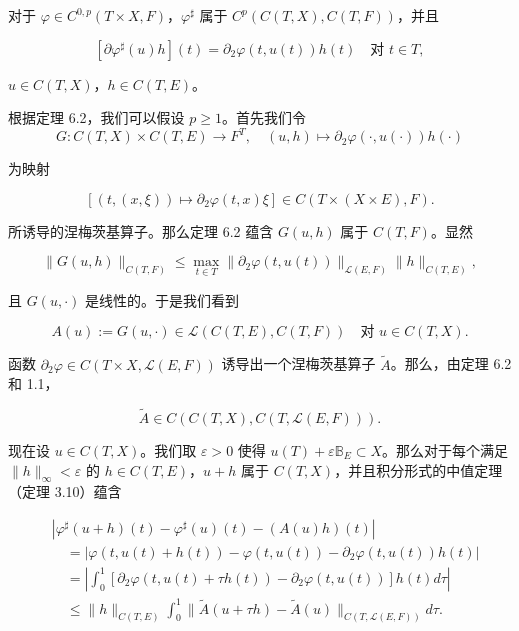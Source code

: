\begin{theorem}

对于 $ \varphi \in C^{0,p}(T \times X, F) $，$ \varphi^{\sharp} $ 属于 $ C^{p}(C(T, X), C(T, F)) $，并且

\[
[\partial\varphi^{\sharp}(u)h](t) = \partial_{2}\varphi(t, u(t))h(t) \quad \text{对 } t \in T ,
\]

$ u \in C(T, X) $，$ h \in C(T, E) $。

\proofhead
根据定理 6.2，我们可以假设 $ p \ge 1 $。首先我们令
\[
G : C(T, X) \times C(T, E) \to F^{T} , \quad (u, h) \mapsto \partial_{2}\varphi(\cdot, u(\cdot))h(\cdot)
\]

为映射

\[
[(t, (x, \xi)) \mapsto \partial_{2}\varphi(t, x)\xi] \in C(T \times (X \times E), F) .
\]

所诱导的涅梅茨基算子。那么定理 6.2 蕴含 $ G(u, h) $ 属于 $ C(T, F) $。显然

\begin{equation}
\|G(u, h)\|_{C(T,F)} \le \max_{t \in T}\|\partial_{2}\varphi(t, u(t))\|_{\mathcal{L}(E,F)}\|h\|_{C(T,E)} ,\tag{6.1}
\end{equation}

且 $ G(u, \cdot) $ 是线性的。于是我们看到

\[
A(u) := G(u, \cdot) \in \mathcal{L}(C(T, E), C(T, F)) \quad \text{对 } u \in C(T, X) .
\]

函数 $ \partial_{2}\varphi \in C(T \times X, \mathcal{L}(E, F)) $ 诱导出一个涅梅茨基算子 $ \widetilde{A} $。那么，由定理 6.2 和 1.1，

\begin{equation}
\widetilde{A} \in C(C(T, X), C(T, \mathcal{L}(E, F))) .\tag{6.2}
\end{equation}

现在设 $ u \in C(T, X) $。我们取 $ \varepsilon > 0 $ 使得 $ u(T) + \varepsilon\mathbb{B}_{E} \subset X $。那么对于每个满足 $ \|h\|_{\infty} < \varepsilon $ 的 $ h \in C(T, E) $，$ u + h $ 属于 $ C(T, X) $，并且积分形式的中值定理（定理 3.10）蕴含

\begin{equation*}
\begin{aligned}
&\left|\varphi^{\sharp}(u + h)(t) - \varphi^{\sharp}(u)(t) - (A(u)h)(t)\right| \\ &\quad = \left|\varphi(t, u(t) + h(t)) - \varphi(t, u(t)) - \partial_{2}\varphi(t, u(t))h(t)\right| \\ &\quad = \left|\int_{0}^{1}[\partial_{2}\varphi(t, u(t) + \tau h(t)) - \partial_{2}\varphi(t, u(t))]h(t) d\tau\right| \\ &\quad \le \|h\|_{C(T,E)}\int_{0}^{1}\|\widetilde{A}(u + \tau h) - \widetilde{A}(u)\|_{C(T,\mathcal{L}(E,F))} d\tau .
\end{aligned}
\end{equation*}


\end{theorem}
